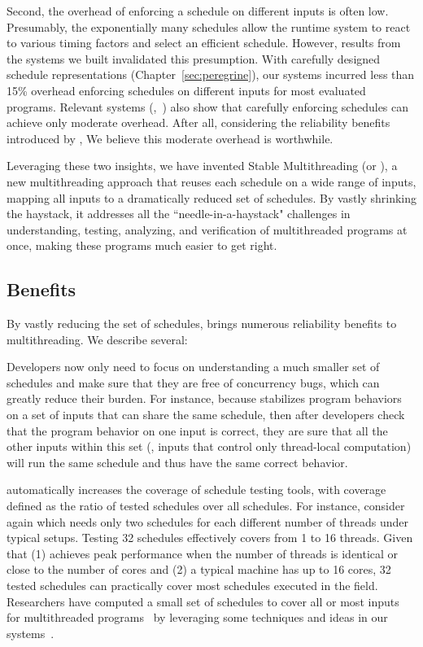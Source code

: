 Second, the overhead of enforcing a schedule on different inputs is often low.
Presumably, the exponentially many schedules allow the
runtime system to react to various timing factors and select an
efficient schedule.  However, results from the \smt systems we built
invalidated this presumption.  With carefully designed schedule
representations (Chapter~\ref{sec:peregrine}), our systems incurred less than
15\%
overhead enforcing schedules on different inputs for most evaluated programs.
Relevant systems (\eg,~\cite{kendo:asplos09, determinator:osdi10}) also show
that
carefully enforcing schedules can achieve only moderate overhead. After all,
considering the reliability benefits introduced by \smt, We believe
this moderate overhead is worthwhile.

Leveraging these two insights, we have invented Stable Multithreading (or \smt),
a new multithreading approach that reuses each schedule on a wide range of
inputs, mapping all inputs to a dramatically reduced set of schedules.
By vastly shrinking the haystack, it addresses all the ``needle-in-a-haystack"
challenges in understanding, testing, analyzing, and verification of
multithreaded programs at once, making these programs much easier to get
right.

\subsection{Benefits}

By vastly reducing the set of schedules, \smt brings numerous reliability
benefits to multithreading.  We describe several:

 Developers now only need to focus on understanding a much
smaller set of schedules and make sure that they are free of concurrency bugs, which
can greatly reduce their burden. For instance, because \smt stabilizes program
behaviors on a set of inputs that can share the same schedule, then
after developers check that the program behavior on one input is correct, they
are sure that all the other inputs within this set (\eg, inputs that control
only thread-local computation) will run the same schedule and thus have the same
correct behavior.

 \smt automatically
increases the coverage of schedule testing tools, with coverage
defined as the ratio of tested schedules over all schedules.
For instance, consider \pbzip again which needs only two
schedules for each different number of threads under typical setups.  Testing 32
schedules effectively covers from 1 to 16 threads.  Given that (1) \pbzip
achieves peak performance when the number of threads is identical or close to
the number of cores and (2) a typical machine has up to 16 cores, 32 tested
schedules can practically cover most schedules executed in the field.
Researchers have computed a small set of schedules to cover all or most
inputs for multithreaded programs~\cite{bergan:oopsla13} by leveraging some
techniques and ideas in our \smt systems~\cite{cui:tern:osdi10,
peregrine:sosp11}.

